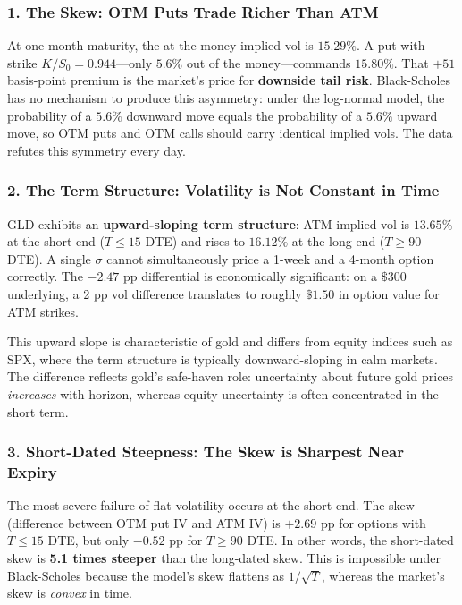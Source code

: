 \documentclass[12pt, a4paper]{article}
\begin{document}
\subsubsection*{1. The Skew: OTM Puts Trade Richer Than ATM}

At one-month maturity, the at-the-money implied vol is $15.29\%$. A put with strike $K/S_0 = 0.944$---only $5.6\%$ out of the money---commands $15.80\%$. That $+51$ basis-point premium is the market's price for \textbf{downside tail risk}. Black-Scholes has no mechanism to produce this asymmetry: under the log-normal model, the probability of a $5.6\%$ downward move equals the probability of a $5.6\%$ upward move, so OTM puts and OTM calls should carry identical implied vols. The data refutes this symmetry every day.

\subsubsection*{2. The Term Structure: Volatility is Not Constant in Time}

GLD exhibits an \textbf{upward-sloping term structure}: ATM implied vol is $13.65\%$ at the short end ($T \leq 15$ DTE) and rises to $16.12\%$ at the long end ($T \geq 90$ DTE). A single $\sigma$ cannot simultaneously price a 1-week and a 4-month option correctly. The $-2.47$ pp differential is economically significant: on a $\$300$ underlying, a 2 pp vol difference translates to roughly $\$1.50$ in option value for ATM strikes.

This upward slope is characteristic of gold and differs from equity indices such as SPX, where the term structure is typically downward-sloping in calm markets. The difference reflects gold's safe-haven role: uncertainty about future gold prices \emph{increases} with horizon, whereas equity uncertainty is often concentrated in the short term.

\subsubsection*{3. Short-Dated Steepness: The Skew is Sharpest Near Expiry}

The most severe failure of flat volatility occurs at the short end. The skew (difference between OTM put IV and ATM IV) is $+2.69$ pp for options with $T \leq 15$ DTE, but only $-0.52$ pp for $T \geq 90$ DTE. In other words, the short-dated skew is \textbf{5.1 times steeper} than the long-dated skew. This is impossible under Black-Scholes because the model's skew flattens as $1/\sqrt{T}$, whereas the market's skew is \emph{convex} in time.
\end{document}
